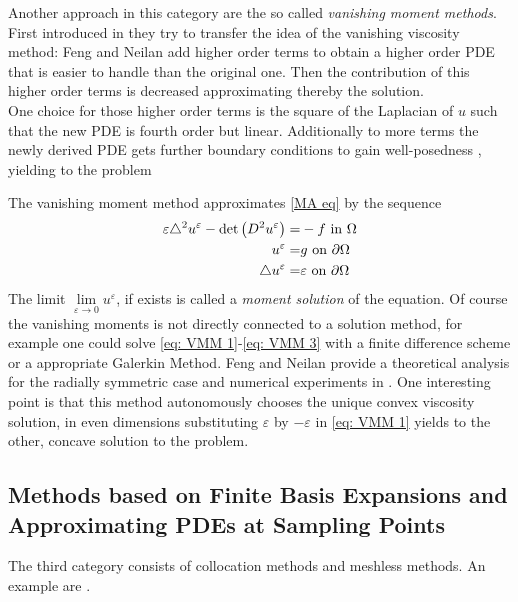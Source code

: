 Another approach in this category are the so called \emph{vanishing moment methods}. First introduced in \cite{FN2009} they try to transfer the idea of the vanishing viscosity method: Feng and Neilan add higher order terms to obtain a higher order PDE that is easier to handle than the original one. Then the contribution of this higher order terms is decreased approximating thereby the \MA solution. \\
One choice for those higher order terms is the square of the Laplacian of $u$ such that the new PDE is fourth order but linear. Additionally to more terms the newly derived PDE gets further boundary conditions to gain well-posedness , yielding to the problem
\begin{definition}
	The vanishing moment method approximates \eqref{MA eq} by the sequence
	\begin{align}
		\varepsilon \triangle^2 u^\varepsilon - \det{\left(D^2 u^\varepsilon\right)} =& -f \text{ in } \Omega \label{eq: VMM 1}\\ 
		u^\varepsilon =& g \text{ on } \partial \Omega \label{eq: VMM 2}\\
		\triangle u^\varepsilon = & \varepsilon \text{ on } \partial \Omega \label{eq: VMM 3}
	\end{align}
The limit $\lim\limits_{\varepsilon \rightarrow 0 } u^\varepsilon$, if exists is called a \emph{moment solution} of the \MA equation.
Of course the vanishing moments is not directly connected to a solution method, for example one could solve \eqref{eq: VMM 1}-\eqref{eq: VMM 3} with a finite difference scheme or a appropriate Galerkin Method.
Feng and Neilan provide a theoretical analysis for the radially symmetric case and numerical experiments in \cite{FN2009, Neilan2010, FN2011a}. One interesting point is that this method autonomously chooses the unique convex viscosity solution, in even dimensions substituting $\varepsilon$ by $-\varepsilon$ in  \eqref{eq: VMM 1} yields to the other, concave solution to the \MA problem.  
\end{definition}


\subsection{Methods based on Finite Basis Expansions and Approximating PDEs at Sampling Points}
The third category consists of collocation methods and meshless methods.
An example are \cite{BHP2014}.
